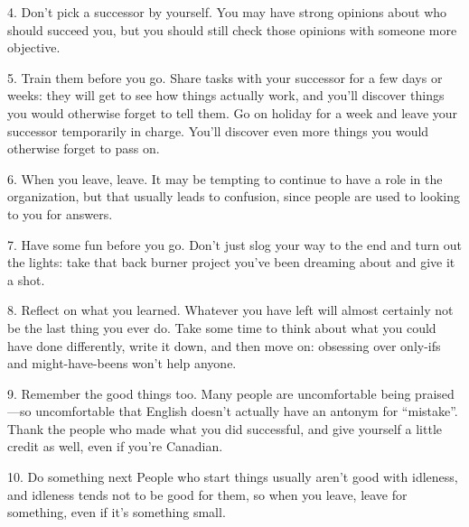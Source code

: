 \documentclass[10pt,letterpaper]{article}
\begin{document}
4.  Don't pick a successor by yourself.
    You may have strong opinions about who should succeed you,
    but you should still check those opinions with someone more objective.

5.  Train them before you go.
    Share tasks with your successor for a few days or weeks:
    they will get to see how things actually work,
    and you'll discover things you would otherwise forget to tell them.
    Go on holiday for a week and leave your successor temporarily in charge.
    You'll discover even more things you would otherwise forget to pass on.

6.  When you leave, leave.
    It may be tempting to continue to have a role in the organization,
    but that usually leads to confusion,
    since people are used to looking to you for answers.

7.  Have some fun before you go.
    Don't just slog your way to the end and turn out the lights:
    take that back burner project you've been dreaming about and give it a shot.

8.  Reflect on what you learned.
    Whatever you have left will almost certainly not be the last thing you ever do.
    Take some time to think about what you could have done differently,
    write it down,
    and then move on:
    obsessing over only-ifs and might-have-beens won't help anyone.

9.  Remember the good things too.
    Many people are uncomfortable being praised---so uncomfortable that
    English doesn't actually have an antonym for ``mistake''.
    Thank the people who made what you did successful,
    and give yourself a little credit as well,
    even if you're Canadian.

10. Do something next
    People who start things usually aren't good with idleness,
    and idleness tends not to be good for them,
    so when you leave,
    leave for something,
    even if it's something small.


\end{document}
